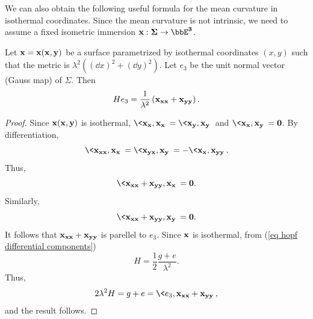 We can also obtain the following useful formula for the mean curvature in isothermal coordinates. Since the mean curvature is not intrinsic, we need to assume a fixed isometric immersion $\bf{x}:\Sigma\to \bbE^3$.
\begin{prop}\label{prop mean curvature laplace}
    Let $\bf{x}=\bf{x}(x,y)$ be a surface parametrized by isothermal coordinates $(x,y)$ such that the metric is $\lambda^2((\dd x)^2+(\dd y)^2)$. Let $e_3$ be the unit normal vector (Gauss map) of $\Sigma$. Then 
    \[H e_3=\frac{1}{\lambda^2}\left(\bf{x}_{xx}+\bf{x}_{yy}\right).\]
\end{prop}
\begin{proof}
    Since $\bf{x}(x,y)$ is isothermal, $\<\bf{x}_x,\bf{x}_x\>=\<\bf{x}_y,\bf{x}_y\>$ and $\<\bf{x}_x,\bf{x}_y\>=0$. By differentiation, 
    \[\<\bf{x}_{xx},\bf{x}_x\>=\<\bf{x}_{yx},\bf{x}_y\>=-\<\bf{x}_x,\bf{x}_{yy}\>.\]
    Thus, 
    \[\<\bf{x}_{xx}+\bf{x}_{yy},\bf{x}_x\>=0.\]
    Similarly, 
    \[\<\bf{x}_{xx}+\bf{x}_{yy},\bf{x}_y\>=0.\]
    It follows that $\bf{x}_{xx}+\bf{x}_{yy}$ is parellel to $e_3$. Since $\bf{x}$ is isothermal, from (\ref{eq hopf differential components})
    \[H=\frac{1}{2}\frac{g+e}{\lambda^2}.\]
    Thus,
    \[2\lambda^2 H=g+e=\<e_3,\bf{x}_{xx}+\bf{x}_{yy}\>,\]
    and the result follows.
\end{proof}


